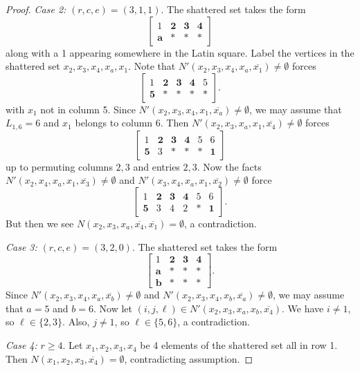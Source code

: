 \documentclass[10pt,a4paper]{amsart}
\begin{document}
\begin{proof}
    \textit{Case 2:} $(r,c,e)=(3,1,1)$. The shattered set takes the form
    $$\begin{bmatrix}
        1&\textbf{2}&\textbf{3}&\textbf{4}\\
        \textbf{a}&*&*&*
    \end{bmatrix}$$
    along with a 1 appearing somewhere in the Latin square. Label the vertices in the shattered set $x_2,x_3,x_4,x_a,x_1$. Note that $N'(x_2,x_3,x_4,x_a,\overline{x_1})\ne\emptyset$ forces 
    $$\begin{bmatrix}
        1&\textbf{2}&\textbf{3}&\textbf{4}&5\\
        \textbf{5}&*&*&*&*
    \end{bmatrix}.$$
    with $x_1$ not in column 5. Since $N'(x_2,x_3,x_4,x_1,\overline{x_a})\ne\emptyset$, we may assume that $L_{1,6}=6$ and $x_1$ belongs to column 6. Then $N'(x_2,x_3,x_a,x_1,\overline{x_4})\ne\emptyset$ forces
    $$\begin{bmatrix}
        1&\textbf{2}&\textbf{3}&\textbf{4}&5&6\\
        \textbf{5}&3&*&*&*&\textbf{1}
    \end{bmatrix}$$
    up to permuting columns $2,3$ and entries $2,3$. Now the facts $N'(x_2,x_4,x_a,x_1,\overline{x_3})\ne\emptyset$ and $N'(x_3,x_4,x_a,x_1,\overline{x_2})\ne\emptyset$ force
    $$\begin{bmatrix}
        1&\textbf{2}&\textbf{3}&\textbf{4}&5&6\\
        \textbf{5}&3&4&2&*&\textbf{1}
    \end{bmatrix}.$$
    But then we see $N(x_2,x_3,x_a,\overline{x_4},\overline{x_1})=\emptyset$, a contradiction.

    \textit{Case 3:} $(r,c,e)=(3,2,0)$. The shattered set takes the form
    $$\begin{bmatrix}
        1&\textbf{2}&\textbf{3}&\textbf{4}\\
        \textbf{a}&*&*&*\\
        \textbf{b}&*&*&*
    \end{bmatrix}.$$
    Since $N'(x_2,x_3,x_4,x_a,\overline{x_b})\ne\emptyset$ and $N'(x_2,x_3,x_4,x_b,\overline{x_a})\ne\emptyset$, we may assume that $a=5$ and $b=6$. Now let $(i,j,\ell)\in N'(x_2,x_3,x_a,x_b,\overline{x_4})$. We have $i\ne 1$, so $\ell\in\{2,3\}$. Also, $j\ne 1$, so $\ell\in\{5,6\}$, a contradiction.

    \textit{Case 4:} $r\ge 4$. Let $x_1,x_2,x_3,x_4$ be 4 elements of the shattered set all in row 1. Then $N(x_1,x_2,x_3,\overline{x_4})=\emptyset$, contradicting assumption.
\end{proof}
\end{document}
